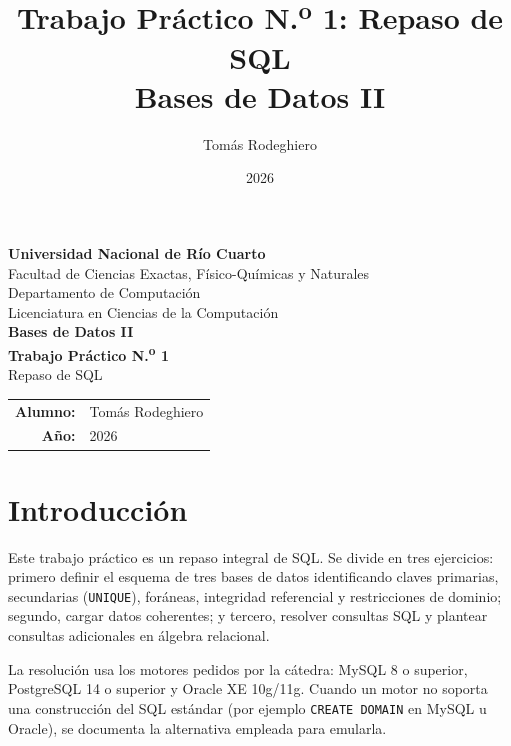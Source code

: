 \documentclass[11pt,a4paper]{article}
\title{Trabajo Práctico N.\textsuperscript{o} 1: Repaso de SQL\\[4pt]
       \large Bases de Datos II}
\author{Tomás Rodeghiero}
\date{2026}
\begin{document}
\begin{titlepage}
    \centering
    \vspace*{1.5cm}

    {\large \textbf{Universidad Nacional de Río Cuarto}}\\[6pt]
    {\normalsize Facultad de Ciencias Exactas, Físico-Químicas y Naturales}\\[4pt]
    {\normalsize Departamento de Computación}\\[4pt]
    {\normalsize Licenciatura en Ciencias de la Computación}\\[3cm]

    {\Large \textbf{Bases de Datos II}}\\[1.2cm]

    {\Large \textbf{Trabajo Práctico N.\textsuperscript{o} 1}}\\[6pt]
    {\large Repaso de SQL}\\[3cm]

    \begin{tabular}{rl}
        \textbf{Alumno:} & Tomás Rodeghiero \\[4pt]
        \textbf{Año:}    & 2026 \\
    \end{tabular}

    \vfill
\end{titlepage}

\tableofcontents
\newpage

\section{Introducción}

Este trabajo práctico es un repaso integral de SQL. Se divide en tres ejercicios: primero definir el esquema de tres bases de datos identificando claves primarias, secundarias (\texttt{UNIQUE}), foráneas, integridad referencial y restricciones de dominio; segundo, cargar datos coherentes; y tercero, resolver consultas SQL y plantear consultas adicionales en álgebra relacional.

La resolución usa los motores pedidos por la cátedra: MySQL 8 o superior, PostgreSQL 14 o superior y Oracle XE 10g/11g. Cuando un motor no soporta una construcción del SQL estándar (por ejemplo \texttt{CREATE DOMAIN} en MySQL u Oracle), se documenta la alternativa empleada para emularla.
\end{document}
